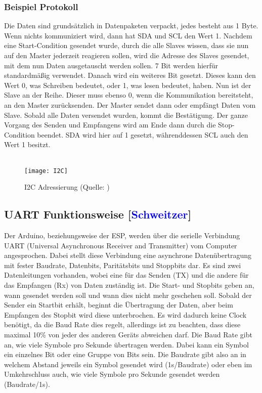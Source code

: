 \documentclass[titlepage,12pt,twoside]{article}
\begin{document}
\subsubsection{Beispiel Protokoll}
Die Daten sind grundsätzlich in Datenpaketen verpackt, jedes besteht aus 1 Byte. 
Wenn nichts kommuniziert wird, dann hat SDA und SCL den Wert 1. Nachdem eine 
Start-Condition gesendet wurde, durch die alle Slaves wissen, dass sie nun auf den 
Master jederzeit reagieren sollen, wird die Adresse des Slaves gesendet, mit dem 
nun Daten ausgetauscht werden sollen. 7 Bit werden hierfür standardmäßig verwendet. 
Danach wird ein weiteres Bit gesetzt. Dieses kann den Wert 0, was Schreiben bedeutet, 
oder 1, was lesen bedeutet, haben. Nun ist der Slave an der Reihe. Dieser muss 
ebenso 0, wenn die Kommunikation bereitsteht, an den Master zurücksenden. Der Master 
sendet dann oder empfängt Daten vom Slave. Sobald alle Daten versendet wurden, 
kommt die Bestätigung. Der ganze Vorgang des Senden und Empfangens wird am Ende 
dann durch die Stop-Condition beendet. SDA wird hier auf 1 gesetzt, währenddessen 
SCL auch den Wert 1 besitzt. \\
\\
\begin{figure}[H]
	\begin{center}
		\scalebox{1.2}
		{\texttt{[image: I2C]}}
		\caption{I2C Adressierung (Quelle: \textcolor{blue}{\cite{I2Cabbildung}})}
		\label{fig:I2C}		
	\end{center}
\end{figure}
\hfill \break

\subsection{UART Funktionsweise [\textcolor{blue}{Schweitzer}]}
\label{chap:UART Funktionsweise}
Der Arduino, beziehungsweise der ESP, werden über die serielle Verbindung UART 
(Universal Asynchronous Receiver and Transmitter) vom Computer angesprochen. 
Dabei stellt diese Verbindung eine asynchrone Datenübertragung mit fester Baudrate, 
Datenbits, Paritätsbits und Stoppbits dar. Es sind zwei Datenleitungen vorhanden, wobei 
eine für das Senden (TX) und die andere für das Empfangen (Rx) von Daten zuständig ist. 
Die Start- und Stopbits geben an, wann gesendet werden soll und wann dies nicht 
mehr geschehen soll. Sobald der Sender ein Startbit erhält, beginnt die Übertragung 
der Daten, aber beim Empfangen des Stopbit wird diese unterbrochen. Es wird 
dadurch keine Clock benötigt, da die Baud Rate dies regelt, allerdings ist zu 
beachten, dass diese maximal 10\% von jeder des anderen Geräts abweichen darf. 
Die Baud Rate gibt an, wie viele Symbole pro Sekunde übertragen werden. Dabei 
kann ein Symbol ein einzelnes Bit oder eine Gruppe von Bits sein. Die Baudrate 
gibt also an in welchem Abstand jeweils ein Symbol gesendet wird (1s/Baudrate) 
oder eben im Umkehrschluss auch, wie viele Symbole pro Sekunde gesendet werden 
(Baudrate/1s). \\
\\
\end{document}
